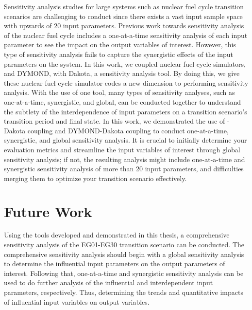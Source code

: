 Sensitivity analysis studies for large systems such as nuclear 
fuel cycle transition scenarios are challenging to conduct 
since there exists a vast input sample space with
upwards of 20 input parameters. 
Previous work towards sensitivity analysis of the nuclear fuel cycle 
includes a one-at-a-time sensitivity analysis of each input parameter 
to see the impact on the output variables of interest.
However, this type of sensitivity analysis fails to capture the 
synergistic effects of the input parameters on the system.  
In this work, we coupled nuclear fuel cycle simulators, \Cyclus and 
DYMOND, with Dakota, a sensitivity analysis tool. 
By doing this, we give these nuclear fuel cycle simulator codes 
a new dimension to performing sensitivity analysis.
With the use of one tool, many types of sensitivity analyses, 
such as one-at-a-time, synergistic, and global, 
can be conducted together to understand the subtlety of the 
interdependence of input parameters on a transition scenario's 
transition period and final state. 
In this work, we demonstrated the use of \Cyclus-Dakota coupling 
and DYMOND-Dakota coupling to conduct one-at-a-time, synergistic, and 
global sensitivity analysis. 
It is crucial to initially determine your evaluation metrics and 
streamline the input variables of interest through global sensitivity 
analysis; if not, the resulting analysis might include one-at-a-time and 
synergistic sensitivity analysis of more than 20 input parameters, 
and difficulties merging them to optimize your transition scenario 
effectively.

\section{Future Work}
Using the tools developed and demonstrated in this thesis, a comprehensive 
sensitivity analysis of the EG01-EG30 transition scenario can be conducted. 
The comprehensive sensitivity analysis should begin with a global
sensitivity analysis to determine the influential input parameters 
on the output parameters of interest. 
Following that, one-at-a-time and synergistic sensitivity analysis can be used to do 
further analysis of the influential and interdependent input parameters, respectively. 
Thus, determining the trends and quantitative impacts of influential input 
variables on output variables.  
